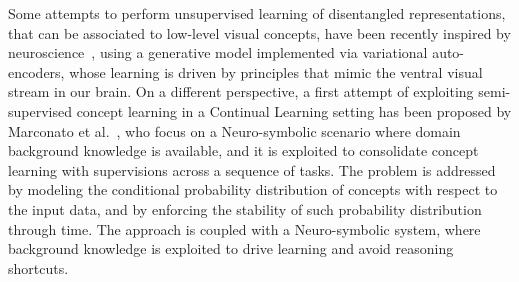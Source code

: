 %
Some attempts to perform unsupervised learning of disentangled representations, that can be associated to low-level visual concepts, have been recently inspired by neuroscience~\cite{higgins2016early}, using a generative model implemented via variational auto-encoders, whose learning is driven by principles that mimic the ventral visual stream in our brain.
%
On a different perspective, a first attempt of exploiting semi-supervised concept learning in a Continual Learning setting has been proposed by Marconato et al.~\cite{marconato2023neuro}, who focus on a Neuro-symbolic scenario where domain background knowledge is available, and it is exploited to consolidate concept learning with supervisions across a sequence of tasks. The problem is addressed by modeling the conditional probability distribution of concepts with respect to the input data, and by enforcing the stability of such probability distribution through time. The approach is coupled with a Neuro-symbolic system, where background knowledge is exploited to drive learning and avoid reasoning shortcuts.

